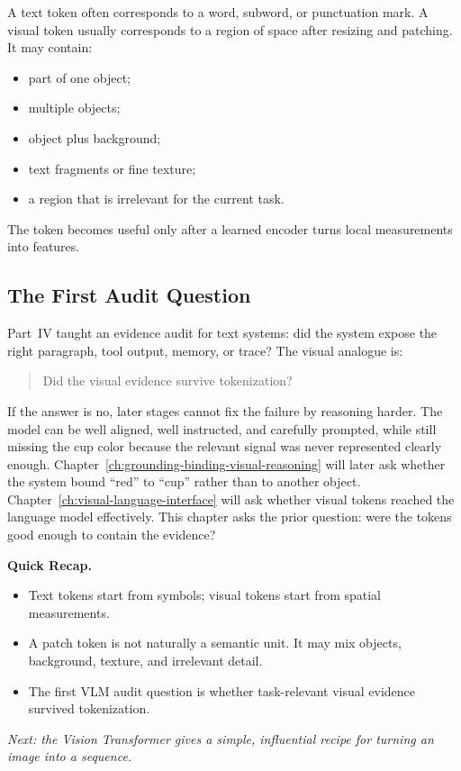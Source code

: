 \begin{tcolorbox}[colback=blue!5, colframe=blue!40, title=\textbf{Visual Tokens Are Not Words}]
A text token often corresponds to a word, subword, or punctuation mark. A visual token usually corresponds to a region of space after resizing and patching. It may contain:
\begin{itemize}[nosep,leftmargin=1.5em]
  \item part of one object;
  \item multiple objects;
  \item object plus background;
  \item text fragments or fine texture;
  \item a region that is irrelevant for the current task.
\end{itemize}
The token becomes useful only after a learned encoder turns local measurements into features.
\end{tcolorbox}

\subsection{The First Audit Question}

Part~IV taught an evidence audit for text systems: did the system expose the right paragraph, tool output, memory, or trace? The visual analogue is:

\begin{quote}
Did the visual evidence survive tokenization?
\end{quote}

If the answer is no, later stages cannot fix the failure by reasoning harder. The model can be well aligned, well instructed, and carefully prompted, while still missing the cup color because the relevant signal was never represented clearly enough. Chapter~\ref{ch:grounding-binding-visual-reasoning} will later ask whether the system bound ``red'' to ``cup'' rather than to another object. Chapter~\ref{ch:visual-language-interface} will ask whether visual tokens reached the language model effectively. This chapter asks the prior question: were the tokens good enough to contain the evidence?

\begin{quickrecap}
\textbf{Quick Recap.}
\begin{itemize}[nosep,leftmargin=1.5em]
  \item Text tokens start from symbols; visual tokens start from spatial measurements.
  \item A patch token is not naturally a semantic unit. It may mix objects, background, texture, and irrelevant detail.
  \item The first VLM audit question is whether task-relevant visual evidence survived tokenization.
\end{itemize}
\textit{Next: the Vision Transformer gives a simple, influential recipe for turning an image into a sequence.}
\end{quickrecap}


